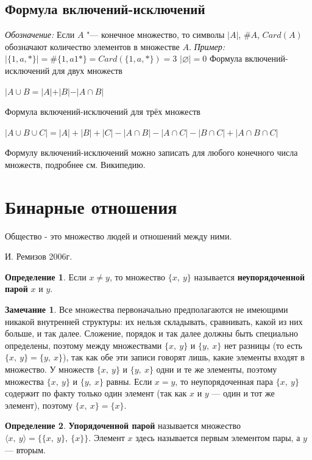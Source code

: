 \documentclass[12pt,oneside]{article}
\theoremstyle{definition}
\newtheorem{definition}{Определение}
\newtheorem{remark}{Замечание}[section]
\begin{document}
\subsection{Формула включений-исключений}
{\it Обозначение: } Если $A$ "--- конечное множество, то символы $|A|$, $\#A$, $Card(A)$ обозначают количество элементов в множестве $A$.
\newline
{\it Пример: } $|\{1, a, *\}| = \#\{1, a1 *\} = Card(\{1, a, *\}) = 3$
\newline
$|\varnothing | = 0$
\newline
Формула включений-исключений для двух множеств

$|A\cup B = |A| + |B| - |A\cap B|$
\newline

Формула включений-исключений для трёх множеств

$|A\cup B\cup C| = |A| + |B| + |C| - |A\cap B| - |A\cap C| - |B\cap C| + |A\cap B\cap C|$

Формулу включений-исключений можно записать для любого конечного числа множеств, подробнее см. Википедию.

\section{Бинарные отношения}
\epigraph{Общество - это множество людей и отношений между ними.}{И. Ремизов 2006г.}

\begin{definition}
Если $x\neq y$, то множество $\{x,\ y\} $ называется \textbf{неупорядоченной парой} $x$ и $y$.
\end{definition}

\begin{remark}
Все множества первоначально предполагаются не имеющими никакой внутренней структуры: их нельзя складывать, сравнивать, какой из них больше, и так далее. Сложение, порядок и так далее должны быть специально определены, поэтому между множествами $\{x,\ y\}$ и $\{y,\ x\}$ нет разницы (то есть $\{x,\ y\} = \{y,\ x\}$), так как обе эти записи говорят лишь, какие элементы входят в множество. У множеств $\{x,\ y\}$ и $\{y,\ x\}$ одни и те же элементы, поэтому множества $\{x,\ y\}$ и $\{y,\ x\}$ равны. Если $x=y$, то неупорядоченная пара $\{x,\ y\}$ содержит по факту только один элемент (так как $x$ и $y$ --- один и тот же элемент), поэтому $\{x,\ x\} = \{x\}$.
\end{remark}

\begin{definition}
\textbf{Упорядоченной парой} называется множество $\langle x,\ y\rangle = \{ \{x,\ y\},\ \{x\} \} $. Элемент $x$ здесь называется первым элементом пары, а $y$ --- вторым.
\end{definition}
\end{document}

